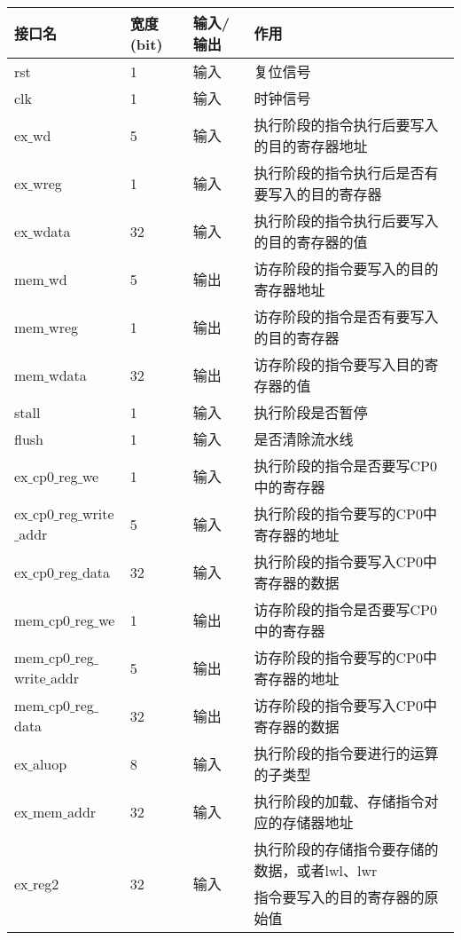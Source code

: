 \quad
	\begin{longtable}{|l|l|l|l|}
		\hline
		接口名 & 宽度(bit) & 输入/输出 & 作用 \\
		\hline
		rst & 1 & 输入 & 复位信号 \\
		\hline
		clk & 1 & 输入 & 时钟信号 \\
		\hline
		ex$\_$wd & 5 & 输入 & 执行阶段的指令执行后要写入的目的寄存器地址 \\
		\hline
		ex$\_$wreg & 1 & 输入 & 执行阶段的指令执行后是否有要写入的目的寄存器 \\
		\hline
		ex$\_$wdata & 32 & 输入 & 执行阶段的指令执行后要写入的目的寄存器的值 \\
		\hline
		mem$\_$wd & 5 & 输出 & 访存阶段的指令要写入的目的寄存器地址 \\
		\hline
		mem$\_$wreg & 1 & 输出 & 访存阶段的指令是否有要写入的目的寄存器 \\
		\hline
		mem$\_$wdata & 32 & 输出 & 访存阶段的指令要写入目的寄存器的值 \\
		\hline
		stall & 1 & 输入 & 执行阶段是否暂停 \\
		\hline
		flush & 1 & 输入 & 是否清除流水线 \\
		\hline
		ex$\_$cp0$\_$reg$\_$we & 1 & 输入 & 执行阶段的指令是否要写CP0中的寄存器 \\
		\hline
		ex$\_$cp0$\_$reg$\_$write$\_$addr & 5 & 输入 & 执行阶段的指令要写的CP0中寄存器的地址 \\
		\hline
		ex$\_$cp0$\_$reg$\_$data & 32 & 输入 & 执行阶段的指令要写入CP0中寄存器的数据 \\
		\hline
		mem$\_$cp0$\_$reg$\_$we & 1 & 输出 & 访存阶段的指令是否要写CP0中的寄存器 \\
		\hline
		mem$\_$cp0$\_$reg$\_$write$\_$addr & 5 & 输出 & 访存阶段的指令要写的CP0中寄存器的地址 \\
		\hline
		mem$\_$cp0$\_$reg$\_$data & 32 & 输出 & 访存阶段的指令要写入CP0中寄存器的数据 \\
		\hline
		ex$\_$aluop & 8 & 输入 & 执行阶段的指令要进行的运算的子类型 \\
		\hline
		ex$\_$mem$\_$addr & 32 & 输入 & 执行阶段的加载、存储指令对应的存储器地址 \\
		\hline
		\multirow{2}{*}{ex$\_$reg2} & \multirow{2}{*}{32} & \multirow{2}{*}{输入} & 执行阶段的存储指令要存储的数据，或者lwl、lwr \\
		& & & 指令要写入的目的寄存器的原始值 \\

\end{longtable}
